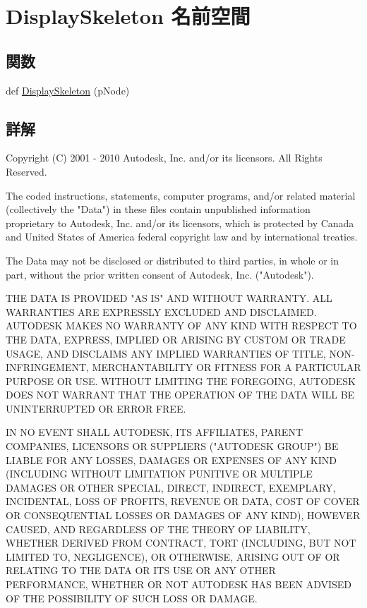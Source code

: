 \hypertarget{namespace_display_skeleton}{}\section{Display\+Skeleton 名前空間}
\label{namespace_display_skeleton}
\subsection*{関数}
\begin{DoxyCompactItemize}
\item 
def \hyperlink{namespace_display_skeleton_aa54779a422e84878e9265fea50c49f26}{Display\+Skeleton} (p\+Node)
\end{DoxyCompactItemize}


\subsection{詳解}
\begin{DoxyVerb} Copyright (C) 2001 - 2010 Autodesk, Inc. and/or its licensors.
 All Rights Reserved.

 The coded instructions, statements, computer programs, and/or related material 
 (collectively the "Data") in these files contain unpublished information 
 proprietary to Autodesk, Inc. and/or its licensors, which is protected by 
 Canada and United States of America federal copyright law and by international 
 treaties. 
 
 The Data may not be disclosed or distributed to third parties, in whole or in
 part, without the prior written consent of Autodesk, Inc. ("Autodesk").

 THE DATA IS PROVIDED "AS IS" AND WITHOUT WARRANTY.
 ALL WARRANTIES ARE EXPRESSLY EXCLUDED AND DISCLAIMED. AUTODESK MAKES NO
 WARRANTY OF ANY KIND WITH RESPECT TO THE DATA, EXPRESS, IMPLIED OR ARISING
 BY CUSTOM OR TRADE USAGE, AND DISCLAIMS ANY IMPLIED WARRANTIES OF TITLE, 
 NON-INFRINGEMENT, MERCHANTABILITY OR FITNESS FOR A PARTICULAR PURPOSE OR USE. 
 WITHOUT LIMITING THE FOREGOING, AUTODESK DOES NOT WARRANT THAT THE OPERATION
 OF THE DATA WILL BE UNINTERRUPTED OR ERROR FREE. 
 
 IN NO EVENT SHALL AUTODESK, ITS AFFILIATES, PARENT COMPANIES, LICENSORS
 OR SUPPLIERS ("AUTODESK GROUP") BE LIABLE FOR ANY LOSSES, DAMAGES OR EXPENSES
 OF ANY KIND (INCLUDING WITHOUT LIMITATION PUNITIVE OR MULTIPLE DAMAGES OR OTHER
 SPECIAL, DIRECT, INDIRECT, EXEMPLARY, INCIDENTAL, LOSS OF PROFITS, REVENUE
 OR DATA, COST OF COVER OR CONSEQUENTIAL LOSSES OR DAMAGES OF ANY KIND),
 HOWEVER CAUSED, AND REGARDLESS OF THE THEORY OF LIABILITY, WHETHER DERIVED
 FROM CONTRACT, TORT (INCLUDING, BUT NOT LIMITED TO, NEGLIGENCE), OR OTHERWISE,
 ARISING OUT OF OR RELATING TO THE DATA OR ITS USE OR ANY OTHER PERFORMANCE,
 WHETHER OR NOT AUTODESK HAS BEEN ADVISED OF THE POSSIBILITY OF SUCH LOSS
 OR DAMAGE. \end{DoxyVerb}
 


